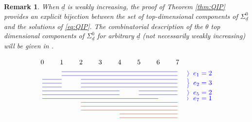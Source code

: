 \documentclass[a4paper]{amsart}
\newcommand{\ud}{\underline{d}}
\theoremstyle{plain}
\newtheorem{remark}[thm]{Remark}
\begin{document}
\begin{remark} \rm
  When $\ud$ is weakly increasing, the proof of Theorem \ref{thm:QIP} provides an explicit bijection between the set of top-dimensional components of $\Sigma^0_{\ud}$ and the solutions of \eqref{eq:QIP}. 
  The combinatorial description of the $\theta$ top dimensional components of $\Sigma^0_{\ud}$ for arbitrary $\ud$ (not necessarily weakly increasing) will be given in \cite{KR}.
\end{remark}






\begin{figure}
\begin{equation*}
\label{eq:lace_diagram2}
\begin{tikzpicture}[baseline=-12]
\node at (0,.5) {$0$};
\node at (1,.5) {$1$};
\node at (2,.5) {$2$};
\node at (3,.5) {$3$};
\node at (4,.5) {$4$};
\node at (5,.5) {$5$};
\node at (6,.5) {$6$};
\node at (7,.5) {$7$};
 
\draw[blue] (1,0) -- (7,0); \draw[blue] (1,-.2) -- (7,-.2);
\draw[blue] (0,-.4) -- (1,-.4); \draw[blue] (2,-.4) -- (7,-.4);
\draw[blue] (0,-.6) -- (1,-.6); \draw[blue] (2,-.6) -- (7,-.6);
\draw[blue] (0,-.8) -- (1,-.8); \draw[blue] (2,-.8) -- (7,-.8);
\draw[blue] (0,-1) -- (4,-1); \draw[blue] (5,-1) -- (7,-1);
\draw[blue] (0,-1.2) -- (4,-1.2); \draw[blue] (5,-1.2) -- (7,-1.2);
\draw[blue] (0,-1.4) -- (6,-1.4); 
  \draw[red] (2,-1.6) -- (7,-1.6);
  \draw[red] (2,-1.8) -- (7,-1.8);
  \draw[red] (2,-2) -- (7,-2);
  \draw[red] (4,-2.2) -- (7,-2.2);
  \draw[red] (4,-2.4) -- (7,-2.4);

\draw[blue] (7.5,0.05) to[out=0,in=180] (7.6,-0.1);
\draw[blue] (7.5,-0.25) to[out=0,in=180] (7.6,-0.1);
\node[blue] at (8.3,-0.1)  {$e_1=2$}; 

\draw[blue] (7.5,-.35) to[out=0,in=180] (7.6,-0.6);
\draw[blue] (7.5,-0.85) to[out=0,in=180] (7.6,-0.6);
\node[blue] at (8.3,-0.6)  {$e_2=3$}; 

\draw[blue] (7.5,-.95) to[out=0,in=180] (7.6,-1.1);
\draw[blue] (7.5,-1.25) to[out=0,in=180] (7.6,-1.1);
\node[blue] at (8.3,-1.1)  {$e_5=2$}; 

\draw[blue] (7.5,-1.31) to[out=0,in=180] (7.56,-1.4);
\draw[blue] (7.5,-1.49) to[out=0,in=180] (7.56,-1.4);
\node[blue] at (8.3,-1.4)  {$e_7=1$}; 


\end{tikzpicture}
\end{equation*}
\end{figure}
\end{document}
